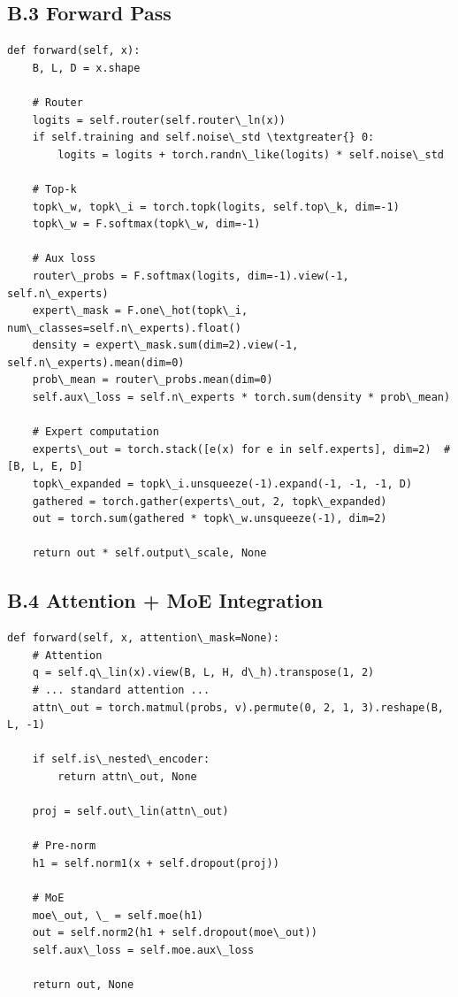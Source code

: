 \subsection{B.3 Forward Pass}

\begin{lstlisting}
def forward(self, x):
    B, L, D = x.shape
    
    # Router
    logits = self.router(self.router\_ln(x))
    if self.training and self.noise\_std \textgreater{} 0:
        logits = logits + torch.randn\_like(logits) * self.noise\_std
    
    # Top-k
    topk\_w, topk\_i = torch.topk(logits, self.top\_k, dim=-1)
    topk\_w = F.softmax(topk\_w, dim=-1)
    
    # Aux loss
    router\_probs = F.softmax(logits, dim=-1).view(-1, self.n\_experts)
    expert\_mask = F.one\_hot(topk\_i, num\_classes=self.n\_experts).float()
    density = expert\_mask.sum(dim=2).view(-1, self.n\_experts).mean(dim=0)
    prob\_mean = router\_probs.mean(dim=0)
    self.aux\_loss = self.n\_experts * torch.sum(density * prob\_mean)
    
    # Expert computation
    experts\_out = torch.stack([e(x) for e in self.experts], dim=2)  # [B, L, E, D]
    topk\_expanded = topk\_i.unsqueeze(-1).expand(-1, -1, -1, D)
    gathered = torch.gather(experts\_out, 2, topk\_expanded)
    out = torch.sum(gathered * topk\_w.unsqueeze(-1), dim=2)
    
    return out * self.output\_scale, None
\end{lstlisting}

\subsection{B.4 Attention + MoE Integration}

\begin{lstlisting}
def forward(self, x, attention\_mask=None):
    # Attention
    q = self.q\_lin(x).view(B, L, H, d\_h).transpose(1, 2)
    # ... standard attention ...
    attn\_out = torch.matmul(probs, v).permute(0, 2, 1, 3).reshape(B, L, -1)
    
    if self.is\_nested\_encoder:
        return attn\_out, None
    
    proj = self.out\_lin(attn\_out)
    
    # Pre-norm
    h1 = self.norm1(x + self.dropout(proj))
    
    # MoE
    moe\_out, \_ = self.moe(h1)
    out = self.norm2(h1 + self.dropout(moe\_out))
    self.aux\_loss = self.moe.aux\_loss
    
    return out, None
\end{lstlisting}

